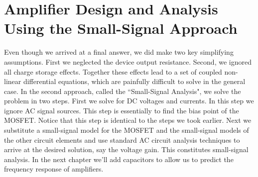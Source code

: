 \section{Amplifier Design and Analysis Using the Small-Signal Approach}
Even though we arrived at a final answer, we did make two key simplifying assumptions.  First we neglected the device output resistance.  Second, we ignored all charge storage effects.  Together these effects lead to a set of coupled non-linear differential equations, which are painfully difficult to solve in the general case.
In the second approach, called the ``Small-Signal Analysis", we solve the problem in two steps.  First we solve for DC voltages and currents.  In this step we ignore AC signal sources.  This step is essentially to find the bias point of the MOSFET.  Notice that this step is identical to the steps we took earlier.  Next we substitute a small-signal model for the MOSFET and the small-signal models of the other circuit elements and use standard AC circuit analysis techniques to arrive at the desired solution, say the voltage gain. This constitutes small-signal analysis.  In the next chapter we'll add capacitors to allow us to predict the frequency response of amplifiers.
